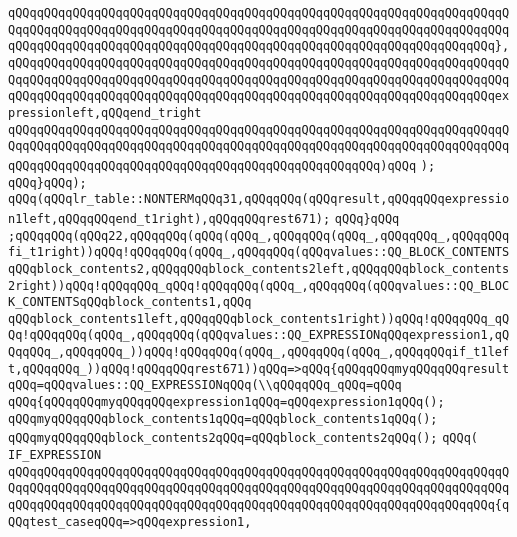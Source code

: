 \verb|qQQqqQQqqQQqqQQqqQQqqQQqqQQqqQQqqQQqqQQqqQQqqQQqqQQqqQQqqQQqqQQqqQQqqQQqqQQqqQQqqQQqqQQqqQQqqQQqqQQqqQQqqQQqqQQqqQQqqQQqqQQqqQQqqQQqqQQqqQQqqQQqqQQqqQQqqQQqqQQqqQQqqQQqqQQqqQQqqQQqqQQqqQQqqQQqqQQqqQQqqQQqqQQq},|\newline
\verb|qQQqqQQqqQQqqQQqqQQqqQQqqQQqqQQqqQQqqQQqqQQqqQQqqQQqqQQqqQQqqQQqqQQqqQQqqQQqqQQqqQQqqQQqqQQqqQQqqQQqqQQqqQQqqQQqqQQqqQQqqQQqqQQqqQQqqQQqqQQqqQQqqQQqqQQqqQQqqQQqqQQqqQQqqQQqqQQqqQQqqQQqqQQqqQQqqQQqqQQqqQQqqQQqexpressionleft,qQQqend_tright|\newline
\verb|qQQqqQQqqQQqqQQqqQQqqQQqqQQqqQQqqQQqqQQqqQQqqQQqqQQqqQQqqQQqqQQqqQQqqQQqqQQqqQQqqQQqqQQqqQQqqQQqqQQqqQQqqQQqqQQqqQQqqQQqqQQqqQQqqQQqqQQqqQQqqQQqqQQqqQQqqQQqqQQqqQQqqQQqqQQqqQQqqQQqqQQqqQQqqQQq)qQQq|\newline
\verb|);|\newline
\verb|qQQq}qQQq);|\newline
\verb|qQQq(qQQqlr_table::NONTERMqQQq31,qQQqqQQq(qQQqresult,qQQqqQQqexpression1left,qQQqqQQqend_t1right),qQQqqQQqrest671);|\newline
\verb|qQQq}qQQq|\newline
\verb|;qQQqqQQq(qQQq22,qQQqqQQq(qQQq(qQQq_,qQQqqQQq(qQQq_,qQQqqQQq_,qQQqqQQqfi_t1right))qQQq!qQQqqQQq(qQQq_,qQQqqQQq(qQQqvalues::QQ_BLOCK_CONTENTSqQQqblock_contents2,qQQqqQQqblock_contents2left,qQQqqQQqblock_contents2right))qQQq!qQQqqQQq_qQQq!qQQqqQQq(qQQq_,qQQqqQQq(qQQqvalues::QQ_BLOCK_CONTENTSqQQqblock_contents1,qQQq|\newline
\verb|qQQqblock_contents1left,qQQqqQQqblock_contents1right))qQQq!qQQqqQQq_qQQq!qQQqqQQq(qQQq_,qQQqqQQq(qQQqvalues::QQ_EXPRESSIONqQQqexpression1,qQQqqQQq_,qQQqqQQq_))qQQq!qQQqqQQq(qQQq_,qQQqqQQq(qQQq_,qQQqqQQqif_t1left,qQQqqQQq_))qQQq!qQQqqQQqrest671))qQQq=>qQQq{qQQqqQQqmyqQQqqQQqresultqQQq=qQQqvalues::QQ_EXPRESSIONqQQq(\\qQQqqQQq_qQQq=qQQq|\newline
\verb|qQQq{qQQqqQQqmyqQQqqQQqexpression1qQQq=qQQqexpression1qQQq();|\newline
\verb|qQQqmyqQQqqQQqblock_contents1qQQq=qQQqblock_contents1qQQq();|\newline
\verb|qQQqmyqQQqqQQqblock_contents2qQQq=qQQqblock_contents2qQQq();|\newline
\verb|qQQq(|\newline
\verb|IF_EXPRESSION|\newline
\verb|qQQqqQQqqQQqqQQqqQQqqQQqqQQqqQQqqQQqqQQqqQQqqQQqqQQqqQQqqQQqqQQqqQQqqQQqqQQqqQQqqQQqqQQqqQQqqQQqqQQqqQQqqQQqqQQqqQQqqQQqqQQqqQQqqQQqqQQqqQQqqQQqqQQqqQQqqQQqqQQqqQQqqQQqqQQqqQQqqQQqqQQqqQQqqQQqqQQqqQQqqQQqqQQq{qQQqtest_caseqQQq=>qQQqexpression1,|\newline
